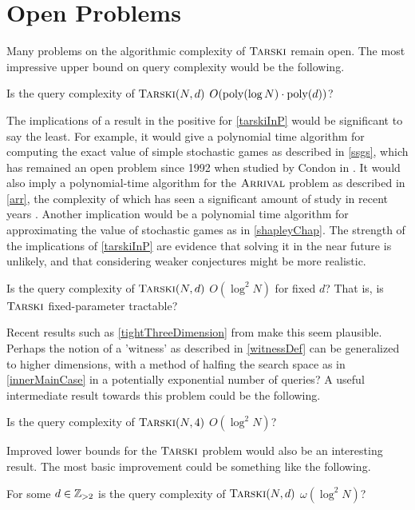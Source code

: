 \section{Open Problems}
Many problems on the algorithmic complexity of $\textsc{Tarski}$ remain 
open. The most impressive upper bound on query complexity would be the following.
\begin{open} \label{tarskiInP}
  Is the query complexity of $\textsc{Tarski}(N, d)$ $O(\mathrm{poly}(\log N) \cdot \mathrm{poly}(d))$?
\end{open}
The implications of a result in the positive for \cref{tarskiInP} would be significant to say the least.
For example, it would give a polynomial time algorithm for
computing the exact value of simple stochastic games as described in \cref{ssgs},
which has remained an open problem since 1992 when studied by Condon in \citep{condon}.
It would also imply a polynomial-time algorithm for the $\textsc{Arrival}$ problem as described in \cref{arr},
the complexity of which has seen a significant amount of study in recent years
\citep{gärtner2021subexponential, gärtner2018arrival, arrivalBasic, arrLowerBound}.
Another implication would be a polynomial time algorithm for approximating the value of
stochastic games as in \cref{shapleyChap}. The strength of the implications of \cref{tarskiInP}
are evidence that solving it in the near future is unlikely, and that considering weaker conjectures
might be more realistic.
\begin{open} \label{tarskiFixedParameterTractable}
  Is the query complexity of 
  $\textsc{Tarski}(N, d)$ $O(\log^2 N)$ for fixed $d$? That is, is $\textsc{Tarski}$ fixed-parameter tractable?
\end{open}
Recent results such as \cref{tightThreeDimension} from \citep{fasterTarski} make this seem
plausible. Perhaps the notion of a 'witness' as described in \cref{witnessDef} can be
generalized to higher dimensions, with a method of halfing the search space as in \cref{innerMainCase}
in a potentially exponential number of queries? A useful intermediate result towards this problem could be
the following.
\begin{open} \label{tightFourDimension}
  Is the query complexity of $\textsc{Tarski}(N, 4)$ $O(\log^2 N)$?
\end{open}
Improved lower bounds for the $\textsc{Tarski}$ problem would also be an interesting
result. The most basic improvement could be something like the following.
\begin{open}
  For some $d \in \mathbb{Z}_{> 2}$ is the query complexity of
  $\textsc{Tarski}(N, d)$ $\omega(\log^2 N)$?
\end{open}
